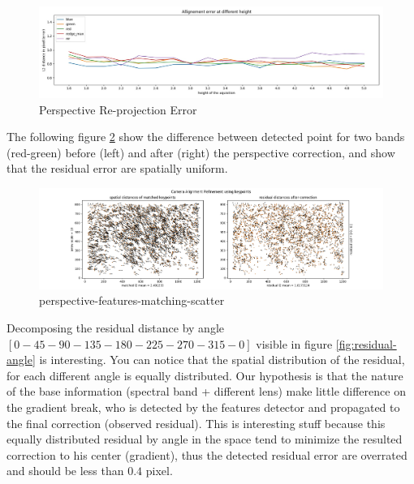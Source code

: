 \documentclass[]{elsarticle}
\begin{document}
	\begin{figure}[!htb]
		\centering
		\includegraphics[width=\linewidth]{../figures/prespective-allignement-rmse.jpg}
		\caption{Perspective Re-projection Error}
		\label{fig:perspective-error}
	\end{figure}
	
	The following figure \ref{fig:perspective-features-matching-scatter} show the difference between detected point for two bands (red-green)
	before (left) and after (right) the perspective correction, and show that the residual error are spatially uniform.
	
	\begin{figure}[!htb]
		\centering
		\includegraphics[width=\linewidth]{../figures/perspective-features-matching-scatter.png}
		\caption{perspective-features-matching-scatter}
		\label{fig:perspective-features-matching-scatter}
	\end{figure}
	
	Decomposing the residual distance by angle $[0-45-90-135-180-225-270-315-0]$ visible in figure \ref{fig:residual-angle} is interesting.
	You can notice that the spatial distribution of the residual, for each different angle is equally distributed.
	Our hypothesis is that the nature of the base information (spectral band + different lens) make little difference on the gradient break,
	who is detected by the features detector and propagated to the final correction (observed residual).
	This is interesting stuff because this equally distributed residual by angle in the space tend to minimize the resulted correction to his center (gradient),
	thus the detected residual error are overrated and should be less than $0.4$ pixel.
	
\end{document}
